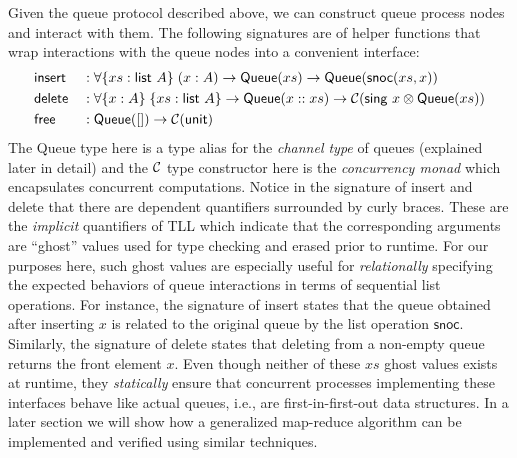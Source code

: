 Given the \textsf{queue} protocol described above, we can construct queue process nodes and
interact with them. The following signatures are of helper functions that wrap interactions with
the queue nodes into a convenient interface:
\begin{alignat*}{2}
  &\textsf{insert} &&: \forall \{xs : \textsf{list}\ A\}\;(x: A) \rightarrow \textsf{Queue}(xs) \rightarrow \textsf{Queue}(\textsf{snoc}(xs, x)) \\
  &\textsf{delete} &&: \forall \{x: A\}\;\{xs : \textsf{list}\ A\} \rightarrow
    \textsf{Queue}(x :: xs) \rightarrow \mcC (\textsf{sing}\ x \otimes \textsf{Queue}(xs)) \\
  &\textsf{free}   &&: \textsf{Queue}([]) \rightarrow \mcC(\textsf{unit})
\end{alignat*}
The \textsf{Queue} type here is a type alias for the \emph{channel type} of queues
(explained later in detail) and the $\mathcal{C}$ type constructor here is the \emph{concurrency monad}
which encapsulates concurrent computations. Notice in the signature of \textsf{insert} and
\textsf{delete} that there are dependent quantifiers surrounded by curly braces.
These are the \emph{implicit} quantifiers of TLL which indicate that the corresponding arguments
are ``ghost'' values used for type checking and erased prior to runtime. For our purposes here,
such ghost values are especially useful for \emph{relationally} specifying the expected
behaviors of queue interactions in terms of sequential list operations. For instance, the
signature of \textsf{insert} states that the queue obtained after inserting $x$ is related to
the original queue by the list operation $\textsf{snoc}$. Similarly, the signature of
\textsf{delete} states that deleting from a non-empty queue returns the front element $x$.
Even though neither of these $xs$ ghost values exists at runtime, they \emph{statically} ensure
that concurrent processes implementing these interfaces behave like actual queues, i.e.,
are first-in-first-out data structures. In a later section we will show how a generalized
map-reduce algorithm can be implemented and verified using similar techniques.


